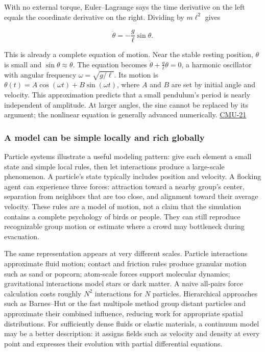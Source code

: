 With no external torque, Euler--Lagrange says the time derivative on the left equals the coordinate derivative on the right. Dividing by \(m\ell^2\) gives

\[
\ddot\theta=-\frac{g}{\ell}\sin\theta.
\]

This is already a complete equation of motion. Near the stable resting position, \(\theta\) is small and \(\sin\theta\approx\theta\). The equation becomes \(\ddot\theta+\frac{g}{\ell}\theta=0\), a harmonic oscillator with angular frequency \(\omega=\sqrt{g/\ell}\). Its motion is \(\theta(t)=A\cos(\omega t)+B\sin(\omega t)\), where \(A\) and \(B\) are set by initial angle and velocity. This approximation predicts that a small pendulum's period is nearly independent of amplitude. At larger angles, the sine cannot be replaced by its argument; the nonlinear equation is generally advanced numerically. \hyperref[04-visual-computing-ii-ch036]{CMU-21}

\subsubsection{A model can be simple locally and rich globally}\label{a-model-can-be-simple-locally-and-rich-globally}

Particle systems illustrate a useful modeling pattern: give each element a small state and simple local rules, then let interactions produce a large-scale phenomenon. A particle's state typically includes position and velocity. A flocking agent can experience three forces: attraction toward a nearby group's center, separation from neighbors that are too close, and alignment toward their average velocity. These rules are a model of motion, not a claim that the simulation contains a complete psychology of birds or people. They can still reproduce recognizable group motion or estimate where a crowd may bottleneck during evacuation.

The same representation appears at very different scales. Particle interactions approximate fluid motion; contact and friction rules produce granular motion such as sand or popcorn; atom-scale forces support molecular dynamics; gravitational interactions model stars or dark matter. A naive all-pairs force calculation costs roughly \(N^2\) interactions for \(N\) particles. Hierarchical approaches such as Barnes--Hut or the fast multipole method group distant particles and approximate their combined influence, reducing work for appropriate spatial distributions. For sufficiently dense fluids or elastic materials, a continuum model may be a better description: it assigns fields such as velocity and density at every point and expresses their evolution with partial differential equations.

